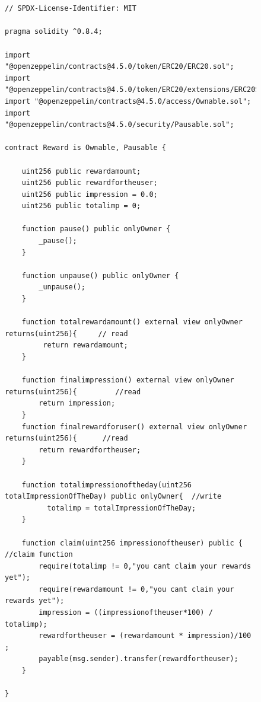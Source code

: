 \documentclass[conference]{IEEEtran}
\begin{document}
\begin{figure}

\begin{lstlisting}[language=Solidity, caption={Example User Reward APPA Contract in Solidity}, numbers=none]


// SPDX-License-Identifier: MIT

pragma solidity ^0.8.4;

import "@openzeppelin/contracts@4.5.0/token/ERC20/ERC20.sol";
import "@openzeppelin/contracts@4.5.0/token/ERC20/extensions/ERC20Snapshot.sol";
import "@openzeppelin/contracts@4.5.0/access/Ownable.sol";
import "@openzeppelin/contracts@4.5.0/security/Pausable.sol";

contract Reward is Ownable, Pausable {
   
    uint256 public rewardamount;
    uint256 public rewardfortheuser;
    uint256 public impression = 0.0;
    uint256 public totalimp = 0;
    
    function pause() public onlyOwner {
        _pause();
    }
    
    function unpause() public onlyOwner {
        _unpause();
    }
    
    function totalrewardamount() external view onlyOwner returns(uint256){     // read 
         return rewardamount;
    }

    function finalimpression() external view onlyOwner returns(uint256){         //read
        return impression;
    }
    function finalrewardforuser() external view onlyOwner returns(uint256){      //read
        return rewardfortheuser;
    }

    function totalimpressionoftheday(uint256 totalImpressionOfTheDay) public onlyOwner{  //write
          totalimp = totalImpressionOfTheDay;
    }
    
    function claim(uint256 impressionoftheuser) public {                         //claim function
        require(totalimp != 0,"you cant claim your rewards yet");
        require(rewardamount != 0,"you cant claim your rewards yet");
        impression = ((impressionoftheuser*100) / totalimp);
        rewardfortheuser = (rewardamount * impression)/100 ;
        payable(msg.sender).transfer(rewardfortheuser);
    }

}
\end{lstlisting}
\end{figure}
\end{document}
